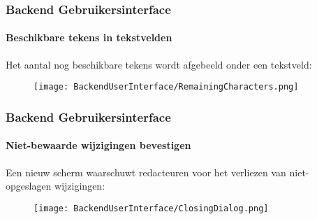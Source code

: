 \begin{frame}[fragile]
	\frametitle{Backend Gebruikersinterface}
	\framesubtitle{Beschikbare tekens in tekstvelden}

	Het aantal nog beschikbare tekens wordt afgebeeld onder een tekstveld:

	\begin{figure}
		\texttt{[image: BackendUserInterface/RemainingCharacters.png]}
	\end{figure}

\end{frame}

\begin{frame}[fragile]
	\frametitle{Backend Gebruikersinterface}
	\framesubtitle{Niet-bewaarde wijzigingen bevestigen}

	Een nieuw scherm waarschuwt redacteuren voor het verliezen van niet-
	opgeslagen wijzigingen:

	\begin{figure}
		\texttt{[image: BackendUserInterface/ClosingDialog.png]}
	\end{figure}

\end{frame}

